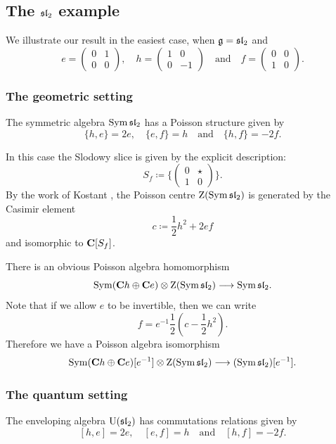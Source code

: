 \subsection{The $\sl_2$ example}

We illustrate our result in the easiest case, when $\g = \sl_2$ and
\[ e = \left(\begin{smallmatrix}
	0 & 1 \\
	0 & 0
\end{smallmatrix}\right), \quad h = \left(\begin{smallmatrix}
	1 & 0 \\
	0 & -1
\end{smallmatrix}\right) \quad \text{and} \quad f = \left(\begin{smallmatrix}
	0 & 0 \\
	1 & 0
\end{smallmatrix}\right). \]

\subsubsection{The geometric setting}

The symmetric algebra $\Sym \sl_2$ has a Poisson structure given by
\[ \{h, e\} = 2 e, \quad \{e, f\} = h \quad \text{and} \quad \{h, f\} = - 2 f. \]

In this case the Slodowy slice is given by the explicit description:
\[ S_f \coloneqq \Big\{\begin{pmatrix}
	0 & \star \\
	1 & 0
\end{pmatrix}\Big\}. \]
By the work of Kostant \cite{kostant1978whittaker}, the Poisson centre $\mathrm{Z}(\Sym \sl_2)$ is generated by the Casimir element
\[ c \coloneqq \frac{1}{2} h^2 + 2 e f \] 
and isomorphic to $\C[S_f]$.

There is an obvious Poisson algebra homomorphism
\[ \Sym(\C h \oplus \C e) \otimes \mathrm{Z}(\Sym \sl_2) \longrightarrow \Sym \sl_2. \]
Note that if we allow $e$ to be invertible, then we can write
\[ f = e^{-1} \frac{1}{2}(c - \frac{1}{2} h^2). \]
Therefore we have a Poisson algebra isomorphism
\[ \Sym(\C h \oplus \C e)[e^{-1}] \otimes \mathrm{Z}(\Sym \sl_2) \longrightarrow (\Sym \sl_2)[e^{-1}]. \]

\subsubsection{The quantum setting}

The enveloping algebra $\U(\sl_2)$ has commutations relations given by
\[ [h, e] = 2 e, \quad [e, f] = h \quad \text{and} \quad [h, f] = - 2 f. \]

